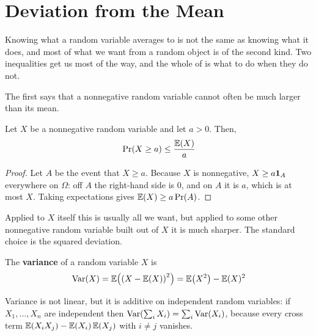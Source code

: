 \section{Deviation from the Mean}

Knowing what a random variable averages to is not the same as knowing what it does, and most of what we want from a random object is of the second kind. Two inequalities get us most of the way, and the whole of  is what to do when they do not.

The first says that a nonnegative random variable cannot often be much larger than its mean.

\begin{boxtheorem} \label{Ch1:Thm:Markov}
    Let $X$ be a nonnegative random variable and let $a > 0$. Then,
    \begin{align*}
        \Pr\!\left( X \geq a \right) \leq \frac{\mathbb{E}(X)}{a}
    \end{align*}
\end{boxtheorem}
\begin{proof}
    Let $A$ be the event that $X \geq a$. Because $X$ is nonnegative, $X \geq a \mathbf{1}_{A}$ everywhere on $\Omega$: off $A$ the right-hand side is $0$, and on $A$ it is $a$, which is at most $X$. Taking expectations gives $\mathbb{E}(X) \geq a \Pr(A)$.
\end{proof}

Applied to $X$ itself this is usually all we want, but applied to some other nonnegative random variable built out of $X$ it is much sharper. The standard choice is the squared deviation.

\begin{boxdefinition}[Variance]
    The \textbf{variance} of a random variable $X$ is
    \begin{align*}
        \operatorname{Var}\!\left( X \right) = \mathbb{E}\!\left( \left( X - \mathbb{E}(X) \right)^2 \right) = \mathbb{E}\!\left( X^2 \right) - \mathbb{E}(X)^2
    \end{align*}
\end{boxdefinition}

Variance is not linear, but it is additive on independent random variables: if $X_1, \ldots, X_n$ are independent then $\operatorname{Var}\!\left( \sum_i X_i \right) = \sum_i \operatorname{Var}\!\left( X_i \right)$, because every cross term $\mathbb{E}\!\left( X_i X_j \right) - \mathbb{E}\!\left( X_i \right) \mathbb{E}\!\left( X_j \right)$ with $i \neq j$ vanishes.

